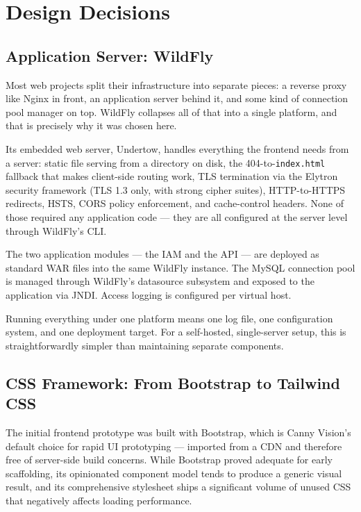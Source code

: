 \section{Design Decisions}

\subsection{Application Server: WildFly}

Most web projects split their infrastructure into separate pieces: a reverse proxy like
Nginx in front, an application server behind it, and some kind of connection pool manager
on top. WildFly collapses all of that into a single platform, and that is precisely why it
was chosen here.

Its embedded web server, Undertow, handles everything the frontend needs from a server:
static file serving from a directory on disk, the 404-to-\texttt{index.html} fallback that
makes client-side routing work, TLS termination via the Elytron security framework (TLS
1.3 only, with strong cipher suites), HTTP-to-HTTPS redirects, HSTS, CORS policy
enforcement, and cache-control headers. None of those required any application code ---
they are all configured at the server level through WildFly's CLI.

The two application modules --- the IAM and the API --- are deployed as standard WAR files
into the same WildFly instance. The MySQL connection pool is managed through WildFly's
datasource subsystem and exposed to the application via JNDI. Access logging is
configured per virtual host.

Running everything under one platform means one log file, one configuration system, and
one deployment target. For a self-hosted, single-server setup, this is straightforwardly
simpler than maintaining separate components.




\subsection{CSS Framework: From Bootstrap to Tailwind CSS}

The initial frontend prototype was built with Bootstrap, which is Canny Vision's default
choice for rapid UI prototyping --- imported from a CDN and therefore free of server-side
build concerns. While Bootstrap proved adequate for early scaffolding, its opinionated
component model tends to produce a generic visual result, and its comprehensive stylesheet
ships a significant volume of unused CSS that negatively affects loading performance.

